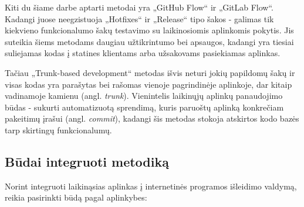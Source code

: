 \documentclass{VUMIFPSkursinis}
\begin{document}
Kiti du šiame darbe aptarti metodai yra „GitHub Flow“ ir „GitLab Flow“. Kadangi juose neegzistuoja „Hotfixes“ ir „Release“ tipo šakos - galimas tik kiekvieno funkcionalumo šakų testavimo su laikinosiomis aplinkomis pokytis. Jis suteikia šiems metodams daugiau užtikrintumo bei apsaugos, kadangi yra tiesiai suliejamas kodas į statines klientams arba užsakovams pasiekiamas aplinkas.

Tačiau „Trunk-based development“ metodas išvis neturi jokių papildomų šakų ir visas kodas yra parašytas bei rašomas vienoje pagrindinėje aplinkoje, dar kitaip vadinamoje kamienu (angl. \textit{trunk}). Vienintelis laikinųjų aplinkų panaudojimo būdas - sukurti automatizuotą sprendimą, kuris paruoštų aplinką konkrečiam pakeitimų įrašui (angl. \textit{commit}), kadangi šis metodas stokoja atskirtos kodo bazės tarp skirtingų funkcionalumų.


\subsection{Būdai integruoti metodiką}

Norint integruoti laikinąsias aplinkas į internetinės programos išleidimo valdymą, reikia pasirinkti būdą pagal aplinkybes:
\end{document}
